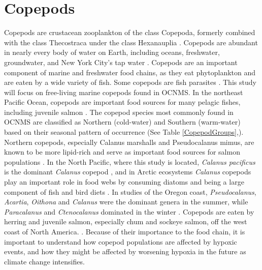 \documentclass[12pt,twoside]{reedthesis}
\begin{document}
\section{Copepods}

Copepods are crustacean zooplankton of the class Copepoda, formerly combined with the class Thecostraca under the class Hexanauplia \autocite{Oakley2013, Lozano-Fernandez2019}. Copepods are abundant in nearly every body of water on Earth, including oceans, freshwater, groundwater, and New York City's tap water \autocite{Vakati2023, Berger2004}. Copepods are an important component of marine and freshwater food chains, as they eat phytoplankton and are eaten by a wide variety of fish. Some copepods are fish parasites \autocite{Vakati2023}. This study will focus on free-living marine copepods found in OCNMS. In the northeast Pacific Ocean, copepods are important food sources for many pelagic fishes, including juvenile salmon \autocite{Brodeur1990}. The copepod species most commonly found in OCNMS are classified as Northern (cold-water) and Southern (warm-water) based on their seasonal pattern of occurrence (See Table \ref{CopepodGroups},\autocite{Fisheries2024, Peterson2003, Peterson1977}).  Northern copepods, especially Calanus marshalls and Pseudocalanus mimus, are known to be more lipid-rich and serve as important food sources for salmon populations \autocite{Fisheries2024}. In the North Pacific, where this study is located, \textit{Calanus pacificus} is the dominant \textit{Calanus} copepod \autocite{Star1981}, and in Arctic ecosystems \textit{Calanus} copepods play an important role in food webs by consuming diatoms and being a large component of fish and bird diets \autocite{Falk-Petersen2007}. In studies of the Oregon coast, \textit{Pseudocalanus}, \textit{Acartia}, \textit{Oithona} and \textit{Calanus} were the dominant genera in the summer, while \textit{Paracalanus} and \textit{Ctenocalanus} dominated in the winter \autocite{Peterson1977, Peterson2003}. Copepods are eaten by herring and juvenile salmon, especially chum and sockeye salmon, off the west coast of North America. \autocite{Brodeur1990, Friedenberg2012}. Because of their importance to the food chain, it is important to understand how copepod populations are affected by hypoxic events, and how they might be affected by worsening hypoxia in the future as climate change intensifies. 
\end{document}

